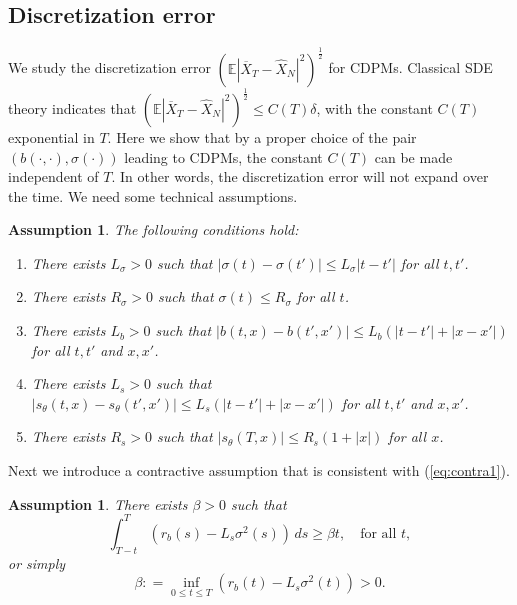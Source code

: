 \documentclass[letterpaper,10pt,reqno]{amsart}
\def\eqref#1{(\ref{#1})}
\newtheorem{assump}[theorem]{Assumption}
\numberwithin{equation}{section}
\begin{document}
\subsection{Discretization error}
\label{sc32}

We study the discretization error $\left(\mathbb{E}|\overline{X}_T - \widehat{X}_N|^2\right)^{\frac{1}{2}}$
for CDPMs.
Classical SDE theory \cite{KP92} indicates that $\left(\mathbb{E}|\overline{X}_T - \widehat{X}_N|^2\right)^{\frac{1}{2}} \le C(T) \delta$,
with the constant $C(T)$ exponential in $T$.
Here we show that by a proper choice of the pair $(b(\cdot, \cdot), \sigma(\cdot))$ leading to CDPMs, 
the constant $C(T)$ can be made independent of $T$.
In other words, the discretization error will not expand over the time.
We need some technical assumptions. 
\begin{assump}
\label{assump:2dis}
The following conditions hold:
\begin{enumerate}[itemsep = 3 pt]
\item 
There exists $L_\sigma > 0$ such that $|\sigma(t) - \sigma(t')| \le L_\sigma |t-t'|$ for all $t, t'$.
\item 
There exists $R_\sigma > 0$ such that $\sigma(t) \le R_\sigma$ for all $t$. 
\item 
There exists $L_b > 0$ such that $|b(t,x) - b(t',x')| \le L_b  (|t-t'| + |x - x'|)$ for all $t,t'$ and $x, x'$.
\item 
There exists $L_s > 0$ such that $|s_\theta(t,x) - s_\theta(t',x')| \le L_s (|t -t'| + |x- x'|)$ for all $t,t'$ and $x,x'$.
\item 
There exists $R_s > 0$ such that $|s_\theta(T,x)| \le R_s (1 + |x|)$ for all $x$.
\end{enumerate}
\end{assump}

\quad Next we introduce a contractive assumption that is consistent with \eqref{eq:contra1}.

\begin{assump}
\label{assump:contraction}
There exists $\beta > 0$ such that
\begin{equation}
\label{eq:condcontraction}
\int_{T-t}^T (r_b(s) - L_s \sigma^2(s))\, ds \ge \beta t, \quad \mbox{for all }t,
\end{equation}
or simply 
\begin{equation}
\label{eq:contral2}
\beta: = \inf_{0 \le t \le T} \left(r_b(t) - L_s \sigma^2(t)\right) > 0.
\end{equation}
\end{assump}
\end{document}
